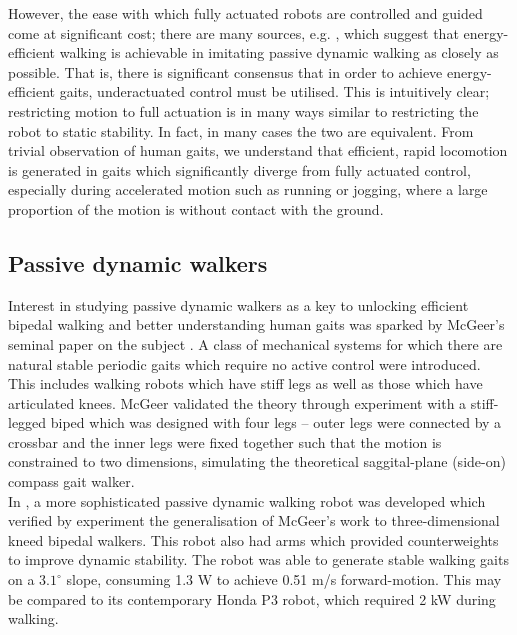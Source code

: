 However, the ease with which fully actuated robots are controlled and guided come at significant cost; there are many sources, e.g. \cite{mcgeer1990passive, asano2007dynamic, byl2008approximate}, which suggest that energy-efficient walking is achievable in imitating passive dynamic walking as closely as possible. That is, there is significant consensus that in order to achieve energy-efficient gaits, underactuated control must be utilised. This is intuitively clear; restricting motion to full actuation is in many ways similar to restricting the robot to static stability. In fact, in many cases the two are equivalent. From trivial observation of human gaits, we understand that efficient, rapid locomotion is generated in gaits which significantly diverge from fully actuated control, especially during accelerated motion such as running or jogging, where a large proportion of the motion is without contact with the ground.

\subsection{Passive dynamic walkers}
Interest in studying passive dynamic walkers as a key to unlocking efficient bipedal walking and better understanding human gaits was sparked by McGeer's seminal paper on the subject \cite{mcgeer1990passive}. A class of mechanical systems for which there are natural stable periodic gaits which require no active control were introduced. This includes walking robots which have stiff legs as well as those which have articulated knees. McGeer validated the theory through experiment with a stiff-legged biped which was designed with four legs -- outer legs were connected by a crossbar and the inner legs were fixed together such that the motion is constrained to two dimensions, simulating the theoretical saggital-plane (side-on) compass gait walker. \\

In \cite{collins2001three}, a more sophisticated passive dynamic walking robot was developed which verified by experiment the generalisation of McGeer's work to three-dimensional kneed bipedal walkers. This robot also had arms which provided counterweights to improve dynamic stability. The robot was able to generate stable walking gaits on a $3.1^{\circ}$ slope, consuming 1.3 W to achieve 0.51 m/s forward-motion. This may be compared to its contemporary Honda P3 robot, which required 2 kW during walking. \\

